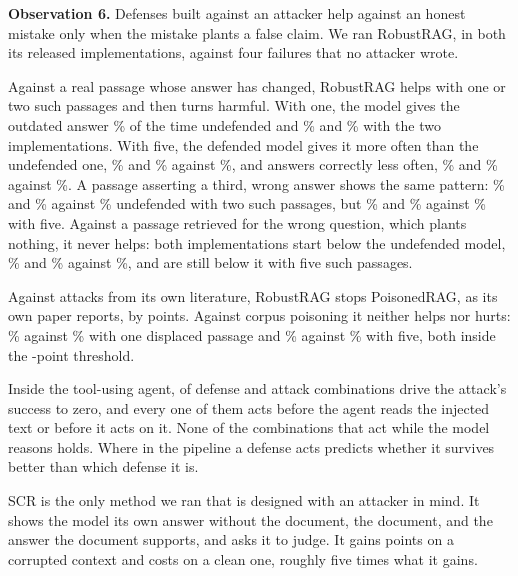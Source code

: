 \label{sec:transfer}
\textbf{Observation 6.} Defenses built against an attacker help against an
honest mistake only when the mistake plants a false claim. We ran RobustRAG,
in both its released implementations, against four failures that no
attacker wrote.

Against a real passage whose answer has changed, RobustRAG helps with one or
two such passages and then turns harmful. With one, the model gives the
outdated answer \EStaleUndefAsrOne\% of the time undefended and
\EStaleKeyAsrOne\% and \EStaleDecAsrOne\% with the two implementations. With
five, the defended model gives it more often than the undefended one,
\EStaleKeyAsrTop\% and \EStaleDecAsrTop\% against \EStaleUndefAsrTop\%, and
answers correctly less often, \EStaleKeyAccTop\% and \EStaleDecAccTop\%
against \EStaleUndefAccTop\%. A passage asserting a third, wrong answer shows
the same pattern: \ERobustDistKeyTwo\% and \ERobustDistDecTwo\% against
\ERobustDistUndefTwo\% undefended with two such passages, but
\ERobustDistKeyFive\% and \ERobustDistDecFive\% against
\ERobustDistUndefFive\% with five. Against a passage retrieved for the wrong
question, which plants nothing, it never helps: both implementations start
below the undefended model, \ERobustMisKeyClean\% and \ERobustMisDecClean\%
against \ERobustMisUndefClean\%, and are still below it with five such
passages.

Against attacks from its own literature, RobustRAG stops PoisonedRAG, as its
own paper reports, by \ERobustPoisonedGain{} points. Against corpus poisoning
it neither helps nor hurts: \ERobustDispOneDef\% against
\ERobustDispOneUndef\% with one displaced passage and \ERobustDispFiveDef\%
against \ERobustDispFiveUndef\% with five, both inside the
\ERobustDispMdr{}-point threshold.

Inside the tool-using agent, \NAgentHolds{} of \NAgentConditions{} defense
and attack combinations drive the attack's success to zero, and every one of
them acts before the agent reads the injected text or before it acts on it.
None of the \NAgentTriedReasoning{} combinations that act while the model
reasons holds. Where in the pipeline a defense acts predicts whether it
survives better than which defense it is.

SCR is the only method we ran that is designed with an attacker in mind. It
shows the model its own answer without the document, the document, and the
answer the document supports, and asks it to judge. It gains
\EScrSatGain{} points on a corrupted context and costs \EScrCleanCost{} on a
clean one, roughly five times what it gains.

